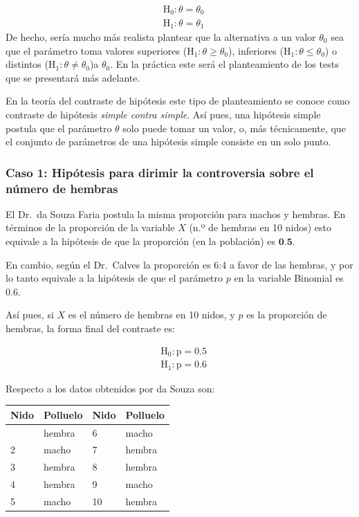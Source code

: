 \documentclass[
]{article}
\begin{document}
\[
\begin{aligned}
& \mathrm{H}_{0}: \theta=\theta_{0} \\
& \mathrm{H}_{1}: \theta=\theta_{1}
\end{aligned}
\] De hecho, sería mucho más realista plantear que la alternativa a un valor \(\theta_0\) sea que el parámetro toma valores superiores (\(\mathrm{H}_{1}: \theta \geq \theta_{0}\)), inferiores (\(\mathrm{H}_{1}: \theta \leq \theta_{0}\)) o distintos (\(\mathrm{H}_{1}: \theta \neq \theta_{0}\))a \(\theta_0\). En la práctica este será el planteamiento de los tests que se presentará más adelante.

En la teoría del contraste de hipótesis este tipo de planteamiento se conoce como contraste de hipótesis \emph{simple contra simple}. Así pues, una hipótesis simple postula que el parámetro \(\theta\) solo puede tomar un valor, o, más técnicamente, que el conjunto de parámetros de una hipótesis simple consiste en un solo punto.

\subsubsection{Caso 1: Hipótesis para dirimir la controversia sobre el número de hembras}\label{caso-1-hipuxf3tesis-para-dirimir-la-controversia-sobre-el-nuxfamero-de-hembras}

El Dr.~da Souza Faria postula la misma proporción para machos y hembras. En términos de la proporción de la variable \(X\) (n.º de hembras en 10 nidos) esto equivale a la hipótesis de que la proporción (en la población) es \(\mathbf{0 . 5}\).

En cambio, según el Dr.~Calves la proporción es 6:4 a favor de las hembras, y por lo tanto equivale a la hipótesis de que el parámetro \(p\) en la variable Binomial es 0.6.

Así pues, si \(X\) es el número de hembras en 10 nidos, y \(p\) es la proporción de hembras, la forma final del contraste es:

\[
\begin{aligned}
& \mathrm{H}_{0}: \mathrm{p}=0.5 \\
& \mathrm{H}_{1}: \mathrm{p}=0.6
\end{aligned}
\]

Respecto a los datos obtenidos por da Souza son:

\begin{longtable}[]{@{}llll@{}}
\toprule\noalign{}
Nido & Polluelo & Nido & Polluelo \\
\midrule\noalign{}
\endhead
\bottomrule\noalign{}
\endlastfoot
1 & hembra & 6 & macho \\
2 & macho & 7 & hembra \\
3 & hembra & 8 & hembra \\
4 & hembra & 9 & macho \\
5 & macho & 10 & hembra \\
\end{longtable}
\end{document}
